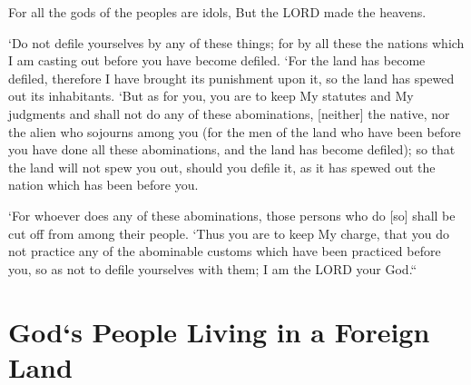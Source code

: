 \vspace{2\baselineskip}

\begin{scripture}[Psalm 96:5]
     
    For all the gods of the peoples are idols, But the LORD made the heavens.
\end{scripture}

\vspace{2\baselineskip}

\begin{scripture}[Leviticus 18:24-30]
        

    `Do not defile yourselves by any of these things; for by all these the nations which I am casting out before you have become defiled.
    `For the land has become defiled, therefore I have brought its punishment upon it, so the land has spewed out its inhabitants.
    `But as for you, you are to keep My statutes and My judgments and shall not do any of these abominations, [neither] the native, nor the alien who sojourns among you
    (for the men of the land who have been before you have done all these abominations, and the land has become defiled);
    so that the land will not spew you out, should you defile it, as it has spewed out the nation which has been before you.

    `For whoever does any of these abominations, those persons who do [so] shall be cut off from among their people.
    `Thus you are to keep My charge, that you do not practice any of the abominable customs which have been practiced before you, so as not to defile yourselves with them; I am the LORD your God.``
\end{scripture}

\vspace{4\baselineskip}




\section{God`s People Living in a Foreign Land}

